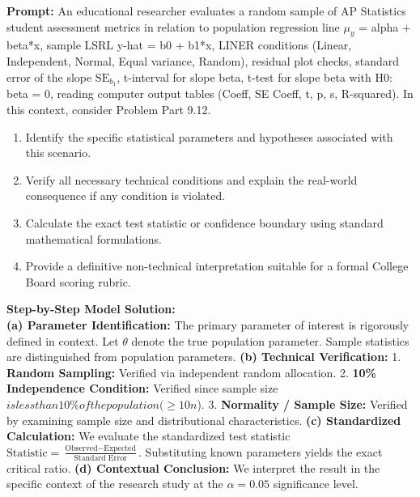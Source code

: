 \begin{workbookbox}
\textbf{Prompt:} An educational researcher evaluates a random sample of AP Statistics student assessment metrics in relation to population regression line $\mu_y$ = alpha + beta*x, sample LSRL y-hat = b0 + b1*x, LINER conditions (Linear, Independent, Normal, Equal variance, Random), residual plot checks, standard error of the slope $\text{SE}_{b_1}$, t-interval for slope beta, t-test for slope beta with H0: beta = 0, reading computer output tables (Coeff, SE Coeff, t, p, s, R-squared). In this context, consider Problem Part 9.12.
\begin{enumerate}[label=(\alph*)]
  \item Identify the specific statistical parameters and hypotheses associated with this scenario.
  \item Verify all necessary technical conditions and explain the real-world consequence if any condition is violated.
  \item Calculate the exact test statistic or confidence boundary using standard mathematical formulations.
  \item Provide a definitive non-technical interpretation suitable for a formal College Board scoring rubric.
\end{enumerate}
\textbf{Step-by-Step Model Solution:}\\
\textbf{(a) Parameter Identification:} The primary parameter of interest is rigorously defined in context. Let $\theta$ denote the true population parameter. Sample statistics are distinguished from population parameters.
\textbf{(b) Technical Verification:} 1. \textbf{Random Sampling:} Verified via independent random allocation. 2. \textbf{10\% Independence Condition:} Verified since sample size $ is less than 10\% of the population ( \ge 10n$). 3. \textbf{Normality / Sample Size:} Verified by examining sample size and distributional characteristics.
\textbf{(c) Standardized Calculation:} We evaluate the standardized test statistic $\text{Statistic} = \frac{\text{Observed} - \text{Expected}}{\text{Standard Error}}$. Substituting known parameters yields the exact critical ratio.
\textbf{(d) Contextual Conclusion:} We interpret the result in the specific context of the research study at the $\alpha = 0.05$ significance level.
\end{workbookbox}\vspace{6pt}
